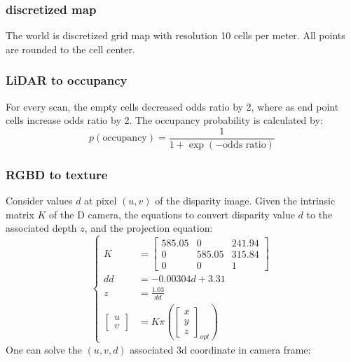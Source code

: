 \documentclass[conference]{IEEEtran}
\begin{document}
\subsubsection{discretized map}
The world is discretized grid map with resolution 10 cells per meter.
All points are rounded to the cell center.

\subsubsection{LiDAR to occupancy}
For every scan, the empty cells decreased odds ratio by 2, where as end point cells
increase odds ratio by 2. The occupancy probability is calculated by:
$$
p\left(\text{occupancy}\right) = \frac{1}{1 + \exp\left(- \text{odds ratio}\right)}
$$

\subsubsection{RGBD to texture}
Consider values $d$ at pixel $(u, v)$ of the disparity image.
Given the intrinsic matrix $K$ of the D camera, 
the equations to convert disparity value $d$ to the associated depth $z$,
and the projection equation:
$$
\left\{  
\begin{aligned}
    K&=\left[ \begin{matrix}585.05&0&241.94\\ 0&585.05&315.84\\ 0&0&1\end{matrix} \right]  \\ 
    dd&=-0.00304d+3.31\\ 
    z&=\frac{1.03}{dd} \\ 
    \left[ \begin{gathered}u\\ v\end{gathered} \right]  &=K\pi \left( \left[ \begin{gathered}x\\ y\\ z\end{gathered} \right]_{opt}  \right)  
\end{aligned}
\right.
$$
One can solve the $(u, v, d)$ associated 3d coordinate in camera frame:
\end{document}
